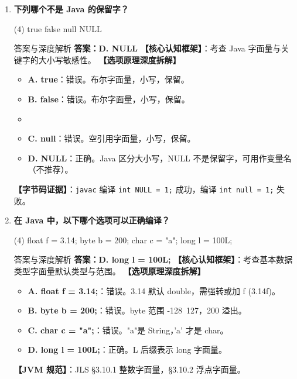 \documentclass[12pt, a4paper]{ctexart}
\newcommand{\code}[1]{\texttt{#1}}
\begin{document}
\begin{enumerate}[label=\textbf{\arabic*.}, itemsep=1em]
\begin{bluebox}{答案与深度解析}
    \textbf{【命题趋势与实战策略】}
    \begin{itemize}[leftmargin=*, nosep]
        \item \textbf{考场秒杀}：见到“最初”、"Oak"选 Sun
        \item \textbf{高频陷阱}：混淆当前所有者 (Oracle) 与原始开发者 (Sun)
    \end{itemize}
    \end{bluebox}

    \item \textbf{下列哪个不是 Java 的保留字？}
    \begin{tasks}(4)
        \task true \task false \task null \task NULL
    \end{tasks}
    \begin{bluebox}{答案与深度解析}
    \textbf{答案：D. NULL}
    \textbf{【核心认知框架】}：考查 Java 字面量与关键字的大小写敏感性。
    \textbf{【选项原理深度拆解】}
    \begin{itemize}[leftmargin=*, nosep]
        \item \textbf{A. true}：错误。布尔字面量，小写，保留。
        \item \textbf{B. false}：错误。布尔字面量，小写，保留。
        \item \item \textbf{C. null}：错误。空引用字面量，小写，保留。
        \item \textbf{D. NULL}：正确。Java 区分大小写，NULL 不是保留字，可用作变量名（不推荐）。
    \end{itemize}
    \textbf{【字节码证据】}：\code{javac} 编译 \code{int NULL = 1;} 成功，编译 \code{int null = 1;} 失败。
    \end{bluebox}

    \item \textbf{在 Java 中，以下哪个选项可以正确编译？}
    \begin{tasks}(4)
        \task float f = 3.14; \task byte b = 200; \task char c = "a"; \task long l = 100L;
    \end{tasks}
    \begin{bluebox}{答案与深度解析}
    \textbf{答案：D. long l = 100L;}
    \textbf{【核心认知框架】}：考查基本数据类型字面量默认类型与范围。
    \textbf{【选项原理深度拆解】}
    \begin{itemize}[leftmargin=*, nosep]
        \item \textbf{A. float f = 3.14;}：错误。3.14 默认 double，需强转或加 f (3.14f)。
        \item \textbf{B. byte b = 200;}：错误。byte 范围 -128~127，200 溢出。
        \item \textbf{C. char c = "a";}：错误。"a"是 String，'a' 才是 char。
        \item \textbf{D. long l = 100L;}：正确。L 后缀表示 long 字面量。
    \end{itemize}
    \textbf{【JVM 规范】}：JLS §3.10.1 整数字面量，§3.10.2 浮点字面量。
    \end{bluebox}


\end{enumerate}
\end{document}
